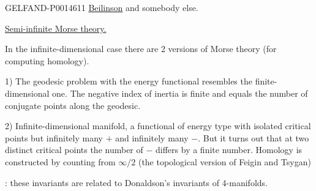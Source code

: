 \begin{GelfandAdjacentEvidence}{GELFAND-P001461}{1}
\underline{Beilinson}  and somebody else.

\underline{Semi-infinite Morse theory.}

In the infinite-dimensional case there are 2 versions of Morse theory (for computing homology).

1) The geodesic problem with the energy functional resembles the finite-dimensional one.
The negative index of inertia is finite and equals the number of conjugate points along the geodesic.

2) Infinite-dimensional manifold, a functional of energy type
with isolated critical points but infinitely many \(+\) and infinitely many \(-\).
But it turns out that at two distinct critical points the number of \(-\) differs by a finite number.
Homology is constructed by counting from \(\infty/2\)
(the topological version of Feigin and Tsygan)

: these invariants are related to Donaldson’s invariants of 4-manifolds.

\end{GelfandAdjacentEvidence}
